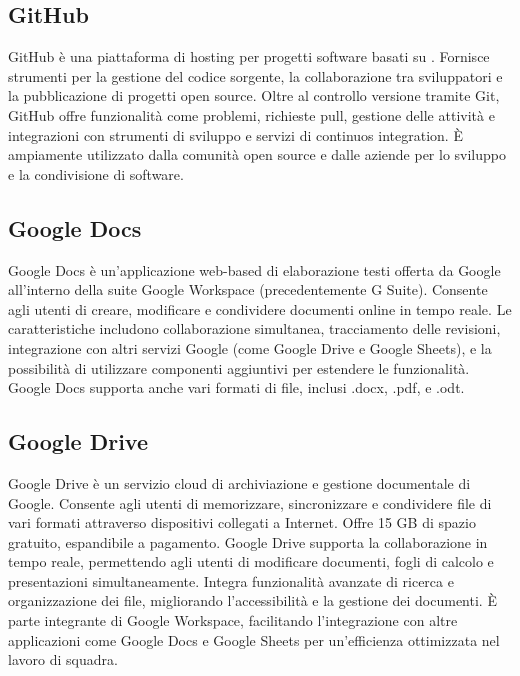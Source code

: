 \vspace{2em}
\subsection*{GitHub}
GitHub è una piattaforma di hosting per progetti software basati su . Fornisce strumenti per la gestione del codice sorgente, la collaborazione tra sviluppatori e la pubblicazione di progetti open source. Oltre al controllo versione tramite Git, GitHub offre funzionalità come problemi, richieste pull, gestione delle attività e integrazioni con strumenti di sviluppo e servizi di continuos integration. È ampiamente utilizzato dalla comunità open source e dalle aziende per lo sviluppo e la condivisione di software.

\vspace{2em}
\subsection*{Google Docs}
Google Docs è un'applicazione web-based di elaborazione testi offerta da Google all'interno della suite Google Workspace (precedentemente G Suite). Consente agli utenti di creare, modificare e condividere documenti online in tempo reale. Le caratteristiche includono collaborazione simultanea, tracciamento delle revisioni, integrazione con altri servizi Google (come Google Drive e Google Sheets), e la possibilità di utilizzare componenti aggiuntivi per estendere le funzionalità. Google Docs supporta anche vari formati di file, inclusi .docx, .pdf, e .odt.

\vspace{2em}
\subsection*{Google Drive}
Google Drive è un servizio cloud di archiviazione e gestione documentale di Google. Consente agli utenti di memorizzare, sincronizzare e condividere file di vari formati attraverso dispositivi collegati a Internet. Offre 15 GB di spazio gratuito, espandibile a pagamento. Google Drive supporta la collaborazione in tempo reale, permettendo agli utenti di modificare documenti, fogli di calcolo e presentazioni simultaneamente. Integra funzionalità avanzate di ricerca e organizzazione dei file, migliorando l'accessibilità e la gestione dei documenti. È parte integrante di Google Workspace, facilitando l'integrazione con altre applicazioni come Google Docs e Google Sheets per un'efficienza ottimizzata nel lavoro di squadra.

